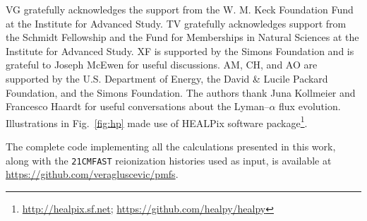 \acknowledgements

VG gratefully acknowledges the support from the W. M. Keck Foundation Fund at the Institute for Advanced Study. TV gratefully acknowledges support from the Schmidt Fellowship and the Fund for Memberships in Natural Sciences at the Institute for Advanced Study. XF is supported by the Simons Foundation and is grateful to Joseph McEwen for useful discussions. AM, CH, and AO are supported by the U.S. Department of Energy, the David \& Lucile Packard Foundation, and the Simons Foundation. The authors thank Juna Kollmeier and Francesco Haardt for useful conversations about the Lyman--$\alpha$ flux evolution. Illustrations in Fig.~\ref{fig:hp} made use of HEALPix \cite{2005ApJ...622..759G} software package\footnote{\url{ http://healpix.sf.net}; \url{https://github.com/healpy/healpy}}. 

The complete code implementing all the calculations presented in this work, along with the \texttt{21CMFAST} reionization histories used as input, is available at \url{https://github.com/veragluscevic/pmfs}.